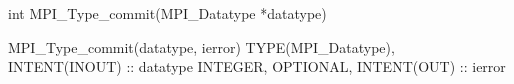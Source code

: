int MPI_Type_commit(MPI_Datatype *datatype)

MPI_Type_commit(datatype, ierror)
TYPE(MPI_Datatype), INTENT(INOUT) :: datatype
INTEGER, OPTIONAL, INTENT(OUT) :: ierror
